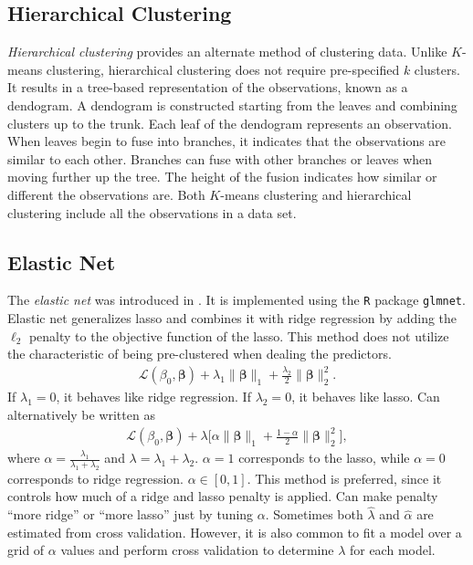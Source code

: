 \documentclass[10pt]{article}
\begin{document}
\subsection{Hierarchical Clustering}
\emph{Hierarchical clustering} provides an alternate method of clustering data. Unlike $K$-means clustering, hierarchical clustering does not require pre-specified $k$ clusters. It results in a tree-based representation of the observations, known as a dendogram. A dendogram is constructed starting from the leaves and combining clusters up to the trunk. Each leaf of the dendogram represents an observation. When leaves begin to fuse into branches, it indicates that the observations are similar to each other. Branches can fuse with other branches or leaves when moving further up the tree. The height of the fusion indicates how similar or different the observations are. 
Both $K$-means clustering and hierarchical clustering include all the observations in a data set. 


\subsection{Elastic Net}

The \emph{elastic net} was introduced in \cite{zou2005regularization}. It is implemented using the \texttt{R} package \texttt{glmnet}.
Elastic net generalizes lasso and combines it with ridge regression by adding the $\ell_{2}$ penalty to the objective function of the lasso. This method does not utilize the characteristic of being pre-clustered when dealing the predictors. 
    \begin{align*}
     \mathcal{L}(\beta_{0},\bm{\beta}) + \lambda_1 \| \bm{\beta} \|_{1} + \frac{\lambda_2}{2} \|\bm{\beta}\|_{2}^{2}.
    \end{align*}
If $\lambda_1 = 0$, it behaves like ridge regression. If $\lambda_{2} = 0$, it behaves like lasso. Can alternatively be written as 
    \begin{align*}
         \mathcal{L}(\beta_0, \bm{\beta})
    + \lambda \Big[ \alpha \| \bm{\beta} \|_{1} + \frac{1 - \alpha}{2} \|\bm{\beta}\|_{2}^{2} \Big],
    \end{align*}
where $\alpha = \frac{\lambda_1}{\lambda_1 + \lambda_2}$ and $\lambda = \lambda_1 + \lambda_2$. $\alpha = 1$ corresponds to the lasso, while $\alpha = 0$ corresponds to ridge regression. $\alpha \in [0,1]$. This method is preferred, since it controls how much of a ridge and lasso penalty is applied. Can make penalty ``more ridge'' or ``more lasso'' just by tuning $\alpha$. Sometimes both $\hat{\lambda}$ and $\hat{\alpha}$ are estimated from cross validation. However, it is also common to fit a model over a grid of $\alpha$ values and perform cross validation to determine $\lambda$ for each model.
\end{document}
